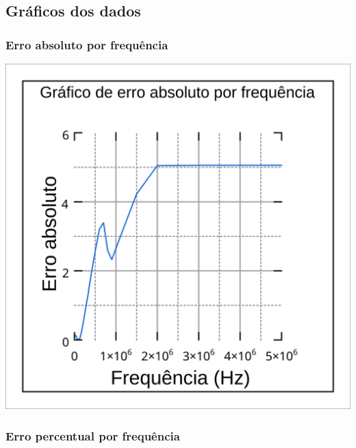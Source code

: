 \documentclass[12pt,twoside, a4paper, twocolumn]{article}
\begin{document}
\subsection{Gráficos dos dados}

\subsubsection{Erro absoluto por frequência}

\begin{adjustbox}{scale=0.30}
    \includegraphics{Grafico1.png}
\end{adjustbox}

\subsubsection{Erro percentual por frequência}
\end{document}

